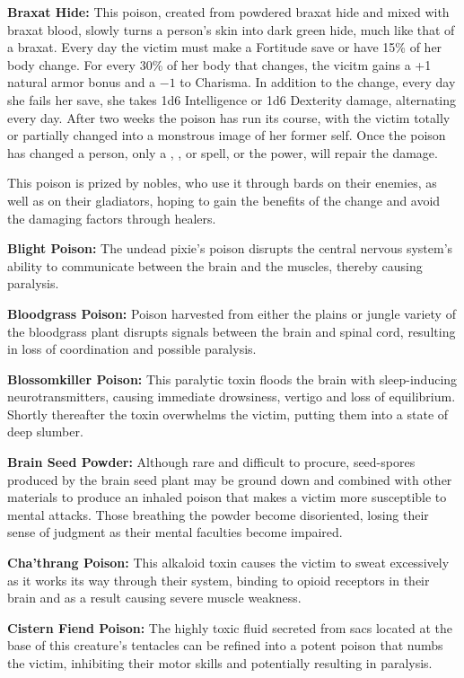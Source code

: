 \textbf{Braxat Hide:} This poison, created from powdered braxat hide and mixed with braxat blood, slowly turns a person's skin into dark green hide, much like that of a braxat. Every day the victim must make a Fortitude save or have 15\% of her body change. For every 30\% of her body that changes, the vicitm gains a +1 natural armor bonus and a $-1$ to Charisma. In addition to the change, every day she fails her save, she takes 1d6 Intelligence or 1d6 Dexterity damage, alternating every day. After two weeks the poison has run its course, with the victim totally or partially changed into a monstrous image of her former self. Once the poison has changed a person, only a , ,  or  spell, or the  power, will repair the damage.

This poison is prized by nobles, who use it through bards on their enemies, as well as on their gladiators, hoping to gain the benefits of the change and avoid the damaging factors through healers.

\textbf{Blight Poison:} The undead pixie's poison disrupts the central nervous system's ability to communicate between the brain and the muscles, thereby causing paralysis.

\textbf{Bloodgrass Poison:} Poison harvested from either the plains or jungle variety of the bloodgrass plant disrupts signals between the brain and spinal cord, resulting in loss of coordination and possible paralysis.

\textbf{Blossomkiller Poison:} This paralytic toxin floods the brain with sleep-inducing neurotransmitters, causing immediate drowsiness, vertigo and loss of equilibrium. Shortly thereafter the toxin overwhelms the victim, putting them into a state of deep slumber.

\textbf{Brain Seed Powder:} Although rare and difficult to procure, seed-spores produced by the brain seed plant may be ground down and combined with other materials to produce an inhaled poison that makes a victim more susceptible to mental attacks. Those breathing the powder become disoriented, losing their sense of judgment as their mental faculties become impaired.


\textbf{Cha'thrang Poison:} This alkaloid toxin causes the victim to sweat excessively as it works its way through their system, binding to opioid receptors in their brain and as a result causing severe muscle weakness.

\textbf{Cistern Fiend Poison:} The highly toxic fluid secreted from sacs located at the base of this creature's tentacles can be refined into a potent poison that numbs the victim, inhibiting their motor skills and potentially resulting in paralysis.

